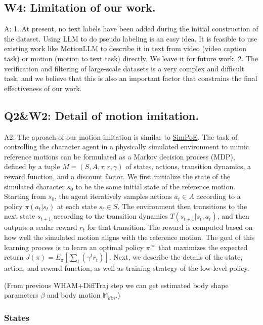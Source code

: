 \documentclass{article}
\begin{document}
\subsection{W4: Limitation of our work.}\label{w4-limitation-of-our-work.}

A: 1. At present, no text labels have been added during the initial construction of the dataset. Using LLM to do pseudo labeling is an easy idea. It is feasible to use existing work like MotionLLM to describe it in text from video (video caption task) or motion (motion to text task) directly. We leave it for future work. 2. The verification and filtering of large-scale datasets is a very complex and difficult task, and we believe that this is also an important factor that constrains the final effectiveness of our work.

\subsection{Q2\&W2: Detail of motion imitation.}\label{q2w2-detail-of-motion-imitation.}

A2: The aproach of our motion imitation is similar to \href{https://arxiv.org/abs/2104.00683}{SimPoE}. The task of controlling the character agent in a physically simulated environment to mimic reference motions can be formulated as a Markov decision process (MDP), defined by a tuple $M=(S,A,\tau,r,\gamma)$ of states, actions, transition dynamics, a reward function, and a discount factor. We first initialize the state of the simulated character $s_0$ to be the same initial state of the reference motion. Starting from $s_0$, the agent iteratively samples actions $a_t \in A$ according to a policy $\pi(a_t | s_t)$ at each state $s_t \in S$. The environment then transitions to the next state $s_{t+1}$ according to the transition dynamics $T(s_{t+1} | s_t, a_t)$, and then outputs a scalar reward $r_t$ for that transition. The reward is computed based on how well the simulated motion aligns with the reference motion. The goal of this learning process is to learn an optimal policy $\pi*$ that maximizes the expected return $J(\pi) = E_\pi[\sum_t(\gamma^tr_t)]$. Next, we describe the details of the state, action, and reward function, as well as training strategy of the low-level policy.

(From previous WHAM+DiffTraj step we can get estimated body shape parameters $\beta$ and body motion $\mathbb{M}_{kin}$.)

\subsubsection{States}\label{states}
\end{document}
